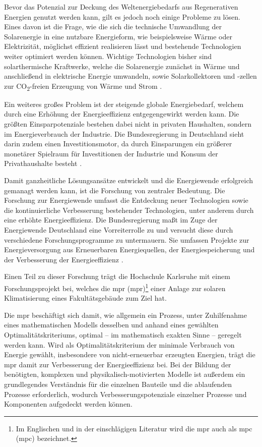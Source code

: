 Bevor das Potenzial zur Deckung des Weltenergiebedarfs aus Regenerativen Energien genutzt werden kann, gilt es jedoch noch einige Probleme zu lösen.
Eines davon ist die Frage, wie die sich die technische Umwandlung der Solarenergie in eine nutzbare Energieform, wie beispielsweise Wärme oder Elektrizität, möglichst effizient realisieren lässt und bestehende Technologien weiter optimiert werden können. Wichtige Technologien bisher sind solarthermische Kraftwerke, welche die Solarenergie zunächst in Wärme und anschließend in elektrische Energie umwandeln, sowie Solarkollektoren und -zellen zur CO\textsubscript{2}-freien Erzeugung von Wärme und Strom \cite[S.~36f.]{qu11}.

Ein weiteres großes Problem ist der steigende globale Energiebedarf, welchem durch eine Erhöhung der Energieeffizienz entgegengewirkt werden kann. Die größten Einsparpotenziale bestehen dabei nicht in privaten Haushalten, sondern im Energieverbrauch der Industrie. Die Bundesregierung in Deutschland sieht darin zudem einen Investitionsmotor, da durch Einsparungen ein größerer monetärer Spielraum für Investitionen der Industrie und Konsum der Privathaushalte besteht \cite[S.~2]{bi15}.

Damit ganzheitliche Lösungsansätze entwickelt und die Energiewende erfolgreich gemanagt werden kann, ist die Forschung von zentraler Bedeutung. Die Forschung zur Energiewende umfasst die Entdeckung neuer Technologien sowie die kontinuierliche Verbesserung bestehender Technologien, unter anderem durch eine erhöhte Energieeffizienz. Die Bundesregierung maßt im Zuge der Energiewende Deutschland eine Vorreiterrolle zu und versucht diese durch verschiedene Forschungsprogramme zu untermauern. Sie umfassen Projekte zur Energieversorgung aus Erneuerbaren Energiequellen, der Energiespeicherung und der Verbesserung der Energieeffizienz \cite[S.~11]{bi15}.
 
Einen Teil zu dieser Forschung trägt die Hochschule Karlsruhe mit einem Forschungsprojekt bei, welches die \acrlong{mpr} (\acrshort{mpr})\footnote{Im Englischen und in der einschlägigen Literatur wird die \acrlong{mpr} auch als \acrlong{mpc} (\acrshort{mpc}) bezeichnet.} einer Anlage zur solaren Klimatisierung eines Fakultätsgebäude zum Ziel hat.

Die \acrlong{mpr} beschäftigt sich damit, wie allgemein ein Prozess, unter Zuhilfenahme eines mathematischen Modells desselben und anhand eines gewählten Optimalitätskriteriums, optimal -- im mathematisch exakten Sinne -- geregelt werden kann. Wird als Optimalitätskriterium der minimale Verbrauch von Energie gewählt, insbesondere von nicht-erneuerbar erzeugten Energien, trägt die \acrshort{mpr} damit zur Verbesserung der Energieeffizienz bei.
Bei der Bildung der benötigten, komplexen und physikalisch-motivierten Modelle ist außerdem ein grundlegendes Verständnis für die einzelnen Bauteile und die ablaufenden Prozesse erforderlich, wodurch Verbesserungspotenziale einzelner Prozesse und Komponenten aufgedeckt werden können.

